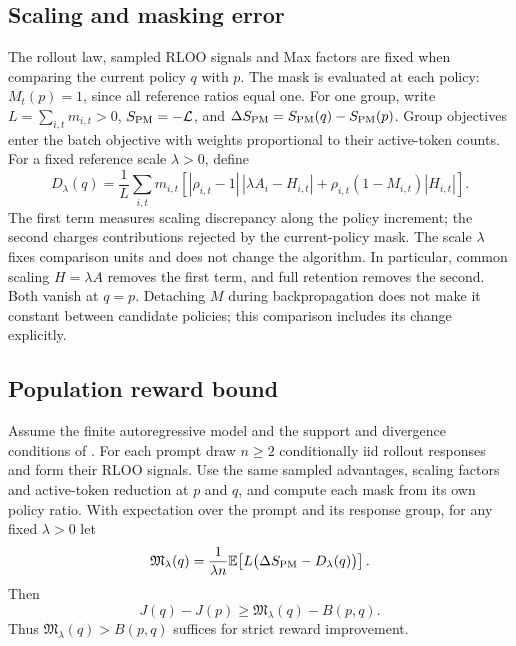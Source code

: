 \subsection{Scaling and masking error}
The rollout law, sampled RLOO signals and Max factors are fixed when
comparing the current policy $q$ with $p$. The mask is evaluated at each
policy: $M_t(p)=1$, since all reference ratios equal one.
For one group, write $L=\sum_{i,t}m_{i,t}>0$, $S_{\rm PM}=-\mathcal L$,
and $\Delta S_{\rm PM}=S_{\rm PM}(q)-S_{\rm PM}(p)$.
Group objectives enter the batch objective with weights proportional
to their active-token counts. For a fixed reference scale $\lambda>0$, define
\[
 D_\lambda(q)=\frac1L\sum_{i,t}m_{i,t}
 \left[|\rho_{i,t}-1|\,|\lambda A_i-H_{i,t}|
       +\rho_{i,t}(1-M_{i,t})|H_{i,t}|\right].
\]
The first term measures scaling discrepancy along the policy increment;
the second charges contributions rejected by the current-policy mask.
The scale $\lambda$ fixes comparison units and does not change the algorithm.
In particular, common scaling $H=\lambda A$ removes the first term,
and full retention removes the second. Both vanish at $q=p$.
Detaching $M$ during backpropagation does not make it constant between
candidate policies; this comparison includes its change explicitly.

\subsection{Population reward bound}
\begin{theorem}
\label{thm:promax-population}
Assume the finite autoregressive model and the support and divergence
conditions of . For each prompt draw $n\ge2$
conditionally iid rollout responses and form their RLOO signals.
Use the same sampled advantages, scaling factors and active-token
reduction at $p$ and $q$, and compute each mask from its own policy ratio.
With expectation over the prompt and its response group, for any fixed
$\lambda>0$ let
\[
 \mathfrak M_\lambda(q)=\frac1{\lambda n}\mathbb{E}\!\left[
 L\bigl(\Delta S_{\rm PM}-D_\lambda(q)\bigr)\right].
\]
Then
\begin{equation}
 J(q)-J(p)\ge\mathfrak M_\lambda(q)-B(p,q).
 \label{eq:promax-population-margin}
\end{equation}
Thus $\mathfrak M_\lambda(q)>B(p,q)$ suffices for strict reward improvement.
\end{theorem}

